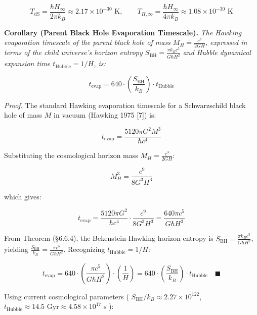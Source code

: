 \documentclass[11pt,a4paper]{article}
\theoremstyle{definition}
\theoremstyle{remark}
\begin{document}
\begin{equation}
T_{\text{dS}} = \frac{\hbar H_\infty}{2\pi k_B} \approx 2.17 \times 10^{-30} \text{ K}, \qquad T_{H,\infty} = \frac{\hbar H_\infty}{4\pi k_B} \approx 1.08 \times 10^{-30} \text{ K}
\end{equation}


\textbf{Corollary (Parent Black Hole Evaporation Timescale).} \textit{The Hawking evaporation timescale of the parent black hole of mass $M_H = \frac{c^3}{2GH}$, expressed in terms of the child universe's horizon entropy $S_{\text{BH}} = \frac{\pi k_B c^5}{G\hbar H^2}$ and Hubble dynamical expansion time $t_{\text{Hubble}} = 1/H$, is:}


\begin{equation}
t_{\text{evap}} = 640 \cdot \left(\frac{S_{\text{BH}}}{k_B}\right) \cdot t_{\text{Hubble}}
\end{equation}


\textit{Proof.} The standard Hawking evaporation timescale for a Schwarzschild black hole of mass $M$ in vacuum (Hawking 1975 [7]) is:


\begin{equation}
t_{\text{evap}} = \frac{5120\pi G^2 M^3}{\hbar c^4}
\end{equation}


Substituting the cosmological horizon mass $M_H = \frac{c^3}{2GH}$:


\begin{equation}
M_H^3 = \frac{c^9}{8 G^3 H^3}
\end{equation}


which gives:


\begin{equation}
t_{\text{evap}} = \frac{5120\pi G^2}{\hbar c^4} \cdot \frac{c^9}{8 G^3 H^3} = \frac{640\pi c^5}{G\hbar H^3}
\end{equation}


From Theorem (\S 6.6.4), the Bekenstein-Hawking horizon entropy is $S_{\text{BH}} = \frac{\pi k_B c^5}{G\hbar H^2}$, yielding $\frac{S_{\text{BH}}}{k_B} = \frac{\pi c^5}{G\hbar H^2}$. Recognizing $t_{\text{Hubble}} = 1/H$:


\begin{equation}
t_{\text{evap}} = 640 \cdot \left(\frac{\pi c^5}{G\hbar H^2}\right) \cdot \left(\frac{1}{H}\right) = 640 \cdot \left(\frac{S_{\text{BH}}}{k_B}\right) \cdot t_{\text{Hubble}} \quad \blacksquare
\end{equation}


Using current cosmological parameters ( $S_{\text{BH}}/k_B \approx 2.27 \times 10^{122}$, $t_{\text{Hubble}} \approx 14.5 \text{ Gyr} \approx 4.58 \times 10^{17} \text{ s}$ ):
\end{document}
